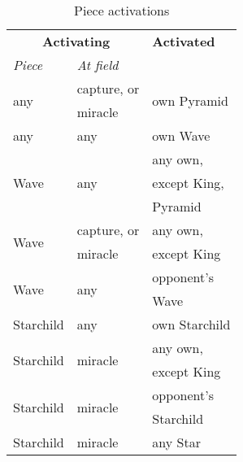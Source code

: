 \begin{table}[!h]
\centering
\begin{tabular}{ lll }
\toprule
\multicolumn{2}{c}{ \textbf{Activating} }                               & \textbf{Activated}            \\ \cmidrule{1-2}
\emph{Piece}                            & \emph{At field}               &                               \\
\midrule
\multirow{2}{*}{any}                    & capture, or                   & \multirow{2}{*}{own Pyramid}  \\
                                        & miracle                       &                               \\ \cmidrule{1-3}
any                                     & any                           & own Wave                      \\ \cmidrule{1-3}
\multirow{3}{*}{Wave}                   & \multirow{3}{*}{any}          & any own,                      \\
                                        &                               & except King,                  \\
                                        &                               & Pyramid                       \\ \cmidrule{1-3}
\multirow{2}{*}{Wave\footnotemark[1]}   & capture, or                   & any own,                      \\
                                        & miracle                       & except King                   \\ \cmidrule{1-3}
\multirow{2}{*}{Wave}                   & \multirow{2}{*}{any}          & opponent's                    \\
                                        &                               & Wave                          \\ \cmidrule{1-3}
Starchild                               & any                           & own Starchild                 \\ \cmidrule{1-3}
\multirow{2}{*}{Starchild}              & \multirow{2}{*}{miracle}      & any own,                      \\
                                        &                               & except King                   \\ \cmidrule{1-3}
\multirow{2}{*}{Starchild}              & \multirow{2}{*}{miracle}      & opponent's                    \\
                                        &                               & Starchild                     \\ \cmidrule{1-3}
Starchild                               & miracle                       & any Star                      \\
\bottomrule
\end{tabular}
\caption{Piece activations}
\label{tbl:Appendix/Summary/Piece activations}
\end{table}


